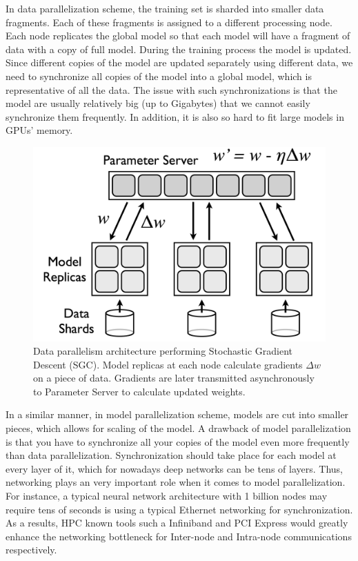 \documentclass[runningheads,a4paper]{llncs}
\begin{document}
In data parallelization scheme, the training set is sharded into smaller data fragments. Each of these fragments is assigned to a different processing node. Each node replicates the global model so that each model will have a fragment of data with a copy of full model. During the training process the model is updated. Since different copies of the model are updated separately using different data, we need to synchronize all copies of the model into a global model, which is representative of all the data. The issue with such synchronizations is that the model are usually relatively big (up to Gigabytes) that we cannot easily synchronize them frequently. In addition, it is also so hard to fit large models in GPUs' memory. \\
\begin{figure}[h]
	\includegraphics[scale=0.3]{./images/data_parallelism.png}
	\centering
	\caption{Data parallelism architecture performing Stochastic Gradient Descent (SGC). Model replicas at each node calculate gradients $\Delta w $ on a piece of data. Gradients are later transmitted asynchronously to Parameter Server to calculate updated weights.}
	\label{fig:data_parallelism}
\end{figure}
In a similar manner, in model parallelization scheme, models are cut into smaller pieces, which allows for scaling of the model. A drawback of model parallelization is that you have to synchronize all your copies of the model even more frequently than data parallelization. Synchronization should take place for each model at every layer of it, which for nowadays deep networks can be tens of layers. Thus, networking plays an very important role when it comes to model parallelization. For instance, a typical neural network architecture with 1 billion nodes may require tens of seconds is using a typical Ethernet networking for synchronization. As a results, HPC known tools such a Infiniband and PCI Express would greatly enhance the networking bottleneck for Inter-node and Intra-node communications respectively.\\
\end{document}
